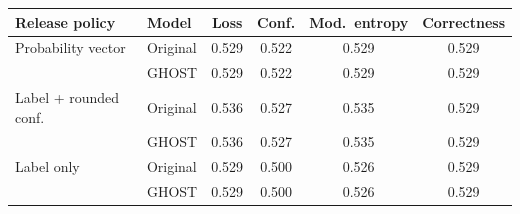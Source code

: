 \footnotesize
\setlength{\tabcolsep}{3pt}
\begin{tabular}{@{}llcccc@{}}
\toprule
Release policy & Model & Loss & Conf. & Mod.\ entropy & Correctness \\
\midrule
Probability vector & Original & 0.529 & 0.522 & 0.529 & 0.529 \\
 & GHOST & 0.529 & 0.522 & 0.529 & 0.529 \\
Label + rounded conf. & Original & 0.536 & 0.527 & 0.535 & 0.529 \\
 & GHOST & 0.536 & 0.527 & 0.535 & 0.529 \\
Label only & Original & 0.529 & 0.500 & 0.526 & 0.529 \\
 & GHOST & 0.529 & 0.500 & 0.526 & 0.529 \\
\bottomrule
\end{tabular}